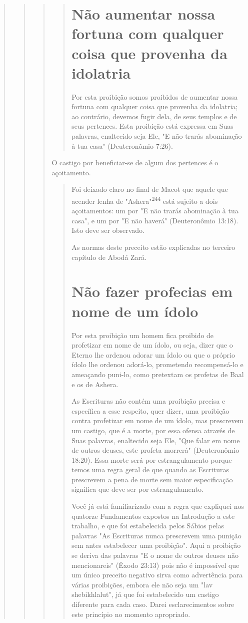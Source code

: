 \begin{quote}
\begin{quote}
\begin{quote}
\begin{quote}
\section{Não aumentar nossa fortuna com qualquer coisa que provenha da idolatria}

Por esta proibição somos proibidos de aumentar nossa fortuna com
qualquer coisa que provenha da idolatria; ao contrário, devemos fugir
dela, de seus templos e de seus pertences. Esta proibição está expressa
em Suas palavras, enaltecido seja Ele, "E não trarás abominação à tua casa"
(Deuteronômio 7:26).
\end{quote}

O castigo por beneficiar-se de algum dos pertences é o açoitamento.

\begin{quote}
Foi deixado claro no final de Macot que aquele que acender lenha de
"Ashera"\textsuperscript{244} está sujeito a dois açoitamentos: um por
"E não trarás abomi­nação à tua casa", e um por "E não haverá"
(Deuteronômio 13:18). Isto deve ser observado.

As normas deste preceito estão explicadas no terceiro capítulo de Abodá
Zará.

\section{Não fazer profecias em nome de um ídolo}

Por esta proibição um homem fica proibido de profetizar em nome de um
ídolo, ou seja, dizer que o Eterno lhe ordenou adorar um ídolo ou que o
próprio ídolo lhe ordenou adorá-lo, prometendo recompensá-lo e
ameaçan­do puni-lo, como pretextam os profetas de Baal e os de Ashera.

As Escrituras não contém uma proibição precisa e específica a esse
respeito, quer dizer, uma proibição contra profetizar em nome de um
ídolo, mas prescrevem um castigo, que é a morte, por essa ofensa através
de Suas pa­lavras, enaltecido seja Ele, "Que falar em nome de outros
deuses, este profeta morrerá" (Deuteronômio 18:20). Essa morte será por
estrangulamento porque temos uma regra geral de que quando as Escrituras
prescrevem a pena de mor­te sem maior especificação significa que deve
ser por estrangulamento.

Você já está familiarizado com a regra que expliquei nos quatorze
Fundamentos expostos na Introdução a este trabalho, e que foi
estabelecida pelos Sábios pelas palavras "As Escrituras nunca prescrevem
uma punição sem antes estabelecer uma proibição". Aqui a proibição se
deriva das palavras "E o nome de outros deuses não mencionareis" (Êxodo
23:13) pois não é impossí­vel que um único preceito negativo sirva como
advertência para várias proibi­ções, embora ele não seja um "lav
shebikhlalut", já que foi estabelecido um castigo diferente para cada
caso. Darei esclarecimentos sobre este princípio no momento apropriado.


\end{quote}
\end{quote}
\end{quote}
\end{quote}
